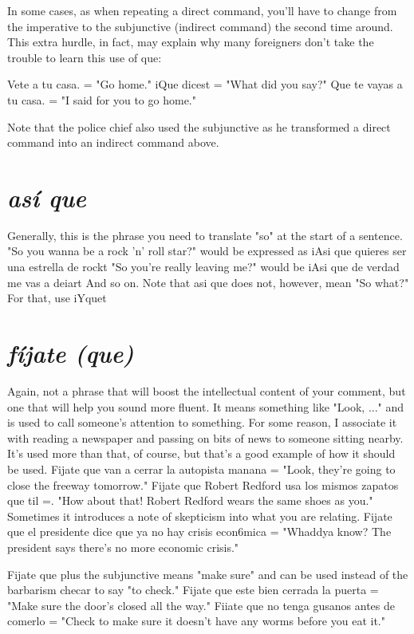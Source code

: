 \bsk

In some cases, as when repeating a direct command, you'll have to
change from the imperative to the subjunctive (indirect command) the
second time around. This extra hurdle, in fact, may explain why many
foreigners don't take the trouble to learn this use of que:

\bsk

Vete a tu casa. = "Go home."
iQue dicest = "What did you say?"
Que te vayas a tu casa. = "I said for you to go home."

\bsk

Note that the police chief also used the subjunctive as he transformed
a direct command into an indirect command above.

\section{\emph{así que}}

Generally, this is the phrase you need to translate "so" at the
start of a sentence. "So you wanna be a rock 'n' roll star?" would be
expressed as iAsi que quieres ser una estrella de rockt "So you're
really leaving me?" would be iAsi que de verdad me vas a deiart And
so on. Note that asi que does not, however, mean "So what?" For that,
use iYquet

\section{\emph{fíjate (que)}}

Again, not a phrase that will boost the intellectual content of
your comment, but one that will help you sound more fluent. It means
something like "Look, ..." and is used to call someone's attention to
something. For some reason, I associate it with reading a newspaper
and passing on bits of news to someone sitting nearby. It's used more
than that, of course, but that's a good example of how it should be
used. Fijate que van a cerrar la autopista manana = "Look, they're
going to close the freeway tomorrow." Fijate que Robert Redford usa
los mismos zapatos que til =. "How about that! Robert Redford wears
the same shoes as you." Sometimes it introduces a note of skepticism
into what you are relating. Fijate que el presidente dice que ya no hay
crisis econ6mica = "Whaddya know? The president says there's no
more economic crisis."

Fijate que plus the subjunctive means "make sure" and can be
used instead of the barbarism checar to say "to check." Fijate que este
bien cerrada la puerta = "Make sure the door's closed all the way."
Fiiate que no tenga gusanos antes de comerlo = "Check to make sure
it doesn't have any worms before you eat it."

